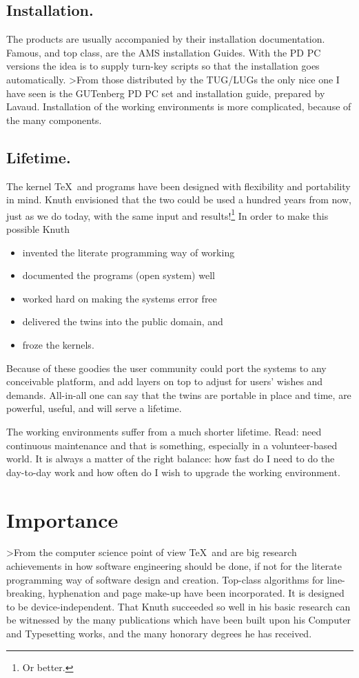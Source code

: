 \subsection{Installation.}
The products are usually accompanied by their installation documentation.
Famous, and top class, are the AMS installation Guides.
With the PD PC versions the idea is to supply turn-key scripts so that
the installation goes automatically.
>From those distributed by the TUG/LUGs the only nice one
I have seen is the GUTenberg  PD PC set and installation guide,
prepared by Lavaud. Installation of the working environments is more
complicated, because of the many components.

\subsection{Lifetime.}
The kernel \TeX\ and \MF{}
programs have been designed with flexibility and portability in mind.
Knuth envisioned that the two could be used a hundred years from now,
just as we do today, with the same
input and  results!\footnote{Or better.}
In order to make this possible Knuth
\begin{itemize}
\item invented the \WEB{} literate programming way of working
\item documented the programs (open system) well
\item worked hard on making the systems error free
\item delivered the twins into the public domain, and
\item froze the kernels.
\end{itemize}
Because of these goodies the user community could port the systems
to any conceivable platform, and add layers on top
to adjust for  users' wishes and demands. All-in-all one can say
that the twins are  portable in place and time, are powerful, useful,
and will serve a lifetime.

The working environments suffer from a much shorter lifetime.
Read: need continuous maintenance and that is something, especially in
a volunteer-based world.
It is always
a matter of the right balance: how fast do I need to do the day-to-day
work and how often do I wish to upgrade the working environment.

\section{Importance}
>From the computer science point of view
\TeX\ and \MF{} are big research achievements
in how software engineering should be done,
if not for the literate programming way of software design and creation.
Top-class algorithms for line-breaking, hyphenation and page make-up
have been incorporated.
It is designed to be device-independent.
That Knuth succeeded so well in his basic research can be witnessed
by the many publications which
have been built upon his Computer and Typesetting works,
and the many honorary degrees he has received.

